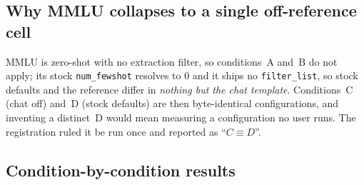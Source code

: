 \subsection{Why MMLU collapses to a single off-reference cell}
\label{app:sensitivity:mmlu-collapse}

MMLU is zero-shot with no extraction filter, so conditions~A and~B do not apply;
its stock \texttt{num\_fewshot} resolves to $0$ and it ships no
\texttt{filter\_list}, so stock defaults and the reference differ in
\emph{nothing but the chat template}. Conditions~C (chat off) and~D (stock
defaults) are then byte-identical configurations, and inventing a distinct~D
would mean measuring a configuration no user runs. The registration ruled it be
run once and reported as ``$C \equiv D$''.

\subsection{Condition-by-condition results}
\label{app:sensitivity:conditions}

